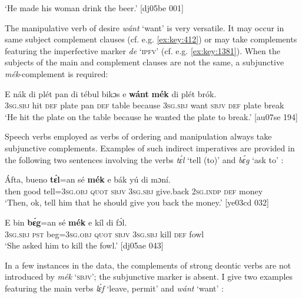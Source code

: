 \glt ‘He made his woman drink the beer.’ [dj05be 001]
\z

The manipulative verb of desire \textit{wánt} ‘want’ is very versatile. It may occur in same subject complement clauses (cf. e.g. \ref{ex:key:412}) or may take complements featuring the imperfective marker \textit{de} ‘\textsc{ipfv}’ (cf. e.g. \ref{ex:key:1381}). When the subjects of the main and complement clauses are not the same, a subjunctive \textit{mék}{}-complement is required: 


\ea%
    \label{ex:key:1400}
    \gll E    nák  di  plét    pan  di  tébul  bikɔs  e    \textbf{wánt}
\textbf{mék}    di  plét    brók.\\
\textsc{3sg.sbj}  hit  \textsc{def}  plate  pan  \textsc{def}  table  because  \textsc{3sg.sbj}  want
\textsc{sbjv}    \textsc{def}  plate  break\\

\glt ‘He hit the plate on the table because he wanted the plate to break.’ [au07se 194]
\z

Speech verbs employed as verbs of ordering and manipulation always take subjunctive complements. Examples of such indirect imperatives{\fff} are provided in the following two sentences involving the verbs \textit{tɛ́l} ‘tell (to)’  and \textit{bɛ́g} ‘ask to’ : {\fff}


\ea%
    \label{ex:key:1401}
    \gll \'{A}fta,  bueno  \textbf{tɛ́l}=an    sé    \textbf{mék}    e    bák
yú    di  mɔní.\\
then  good  tell=\textsc{3sg.obj}  \textsc{quot}    \textsc{sbjv}    \textsc{3sg.sbj}  give.back
\textsc{2sg.indp}  \textsc{def}  money\\

\glt ‘Then, ok, tell him that he should give you back the money.’ [ye03cd 032]
\z


\ea%
    \label{ex:key:1402}
    \gll E    bin  \textbf{bɛ́g}=an    sé    \textbf{mék}    e    kíl  di  fɔ́l.\\
\textsc{3sg.sbj}  \textsc{pst}  beg=\textsc{3sg.obj}  \textsc{quot}    \textsc{sbjv}    \textsc{3sg.sbj}  kill  \textsc{def}  fowl\\

\glt ‘She asked him to kill the fowl.’ [dj05ae 043]
\z

In a few instances in the data, the complements of strong deontic verbs are not introduced by \textit{mék} ‘\textsc{sbjv}’; the subjunctive marker is absent. I give two examples featuring the main verbs \textit{lɛ́f} ‘leave, permit’  and \textit{wánt} ‘want’ : 


